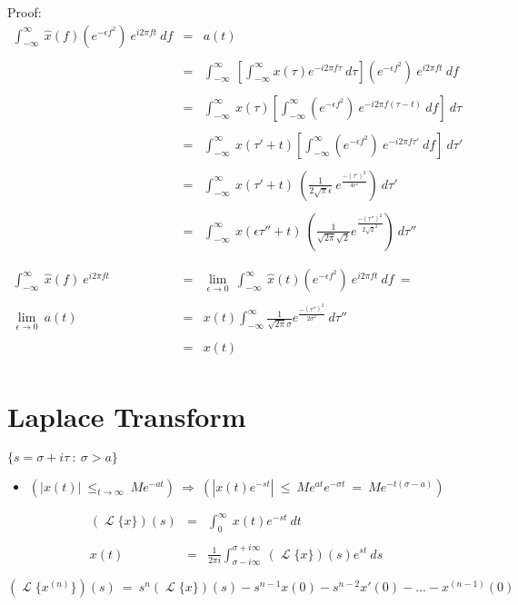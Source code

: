 \documentclass[12pt]{article}
\DeclareMathOperator{\Lapl}{\mathcal{L}}
\begin{document}
Proof:
\begin{eqnarray*}
	\int_{-\infty}^{\infty} \ \hat{x}(f) (e^{-\epsilon f^2}) \ e^{i 2\pi f t} \ df &=& a(t) \\ \\
	&=& \int_{-\infty}^{\infty} \ \left[ \int_{-\infty}^{\infty} x(\tau) e^{-i 2\pi f \tau} \ d\tau \right] (e^{-\epsilon f^2}) \ e^{i 2\pi f t} \ df \\ \\
	&=& \int_{-\infty}^{\infty} \ x(\tau) \left[ \int_{-\infty}^{\infty} (e^{-\epsilon f^2}) \ e^{- i 2\pi f (\tau-t)} \ df \right] \ d\tau \\ \\
	&=& \int_{-\infty}^{\infty} \ x(\tau'+t) \left[ \int_{-\infty}^{\infty} (e^{-\epsilon f^2}) \ e^{- i 2\pi f\tau'} \ df \right] \ d\tau' \\ \\
	&=& \int_{-\infty}^{\infty} \ x(\tau'+t) \ \left( \frac{1}{2\sqrt{\pi}\epsilon} \ e^{\frac{-(\tau')^2}{4\epsilon^2}} \right) \ d\tau' \\ \\
	&=& \int_{-\infty}^{\infty} \ x(\epsilon\tau''+t) \ \left( \frac{1}{\sqrt{2\pi}\sqrt{2}} e^{ \frac{-(\tau'')^2}{2\sqrt{2}^2} } \right) \ d\tau'' \\ \\ \\
	\int_{-\infty}^{\infty} \ \hat{x}(f) \ e^{i 2\pi f t} &=& \lim_{\epsilon\rightarrow 0} \ \int_{-\infty}^{\infty} \ \hat{x}(t) (e^{-\epsilon f^2}) \ e^{i 2\pi f t} \ df \ = \ \\ \\
	\lim_{\epsilon\rightarrow 0} \ a(t) &=& x(t) \int_{-\infty}^{\infty} \frac{1}{\sqrt{2\pi}\sigma} e^{ \frac{-(\tau'')^2}{2\sigma^2} } \ d\tau'' \\ \\
	&=& x(t) \\
\end{eqnarray*}

\section{Laplace Transform}
$\{ s = \sigma + i\tau \ : \ \sigma > a \}$
\begin{itemize}
	\item $\displaystyle\left( \left| x(t) \right| \ \leq_{t\rightarrow\infty} \ Me^{-at} \right) \ \Rightarrow \ \left( \left| x(t)e^{-st} \right| \ \leq \ Me^{at} e^{-\sigma t} \ = \ Me^{-t(\sigma-a)} \right)$ \\
\end{itemize}
\boldmath \begin{eqnarray*}
	(\Lapl{\{x\}}) (s) &=& \int_{0}^{\infty} \ x(t) e^{-st} \ dt \\ \\
	x(t) &=& \frac{1}{2\pi i} \int_{\sigma-i\infty}^{\sigma+i\infty} \ (\Lapl{\{x\}}) (s) e^{st} \ ds \\ \\
\end{eqnarray*} \unboldmath
$(\Lapl{ \{ x^{(n)} \} }) (s) \ = \ s^n (\Lapl{ \{ x \}})(s) - s^{n-1}x(0) - s^{n-2}x'(0) - ... - x^{(n-1)}(0)$
\end{document}
